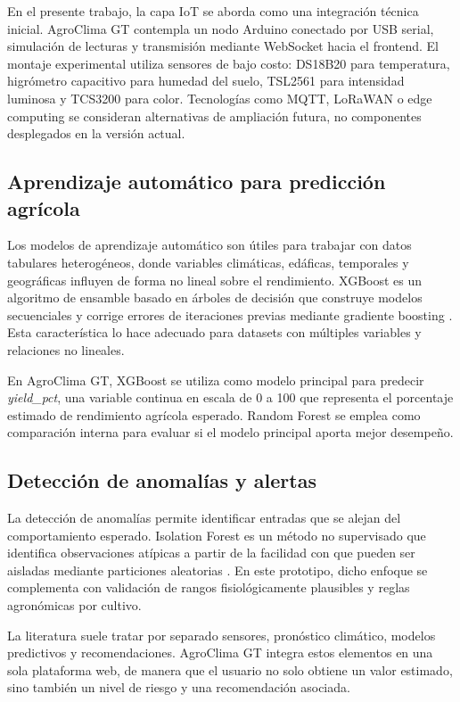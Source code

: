 \documentclass[conference,a4paper]{IEEEtran}
\begin{document}
En el presente trabajo, la capa IoT se aborda como una integración técnica inicial. AgroClima GT contempla un nodo Arduino conectado por USB serial, simulación de lecturas y transmisión mediante WebSocket hacia el frontend. El montaje experimental utiliza sensores de bajo costo: DS18B20 para temperatura, higrómetro capacitivo para humedad del suelo, TSL2561 para intensidad luminosa y TCS3200 para color. Tecnologías como MQTT, LoRaWAN o edge computing se consideran alternativas de ampliación futura, no componentes desplegados en la versión actual.

\subsection{Aprendizaje automático para predicción agrícola}
Los modelos de aprendizaje automático son útiles para trabajar con datos tabulares heterogéneos, donde variables climáticas, edáficas, temporales y geográficas influyen de forma no lineal sobre el rendimiento. XGBoost es un algoritmo de ensamble basado en árboles de decisión que construye modelos secuenciales y corrige errores de iteraciones previas mediante gradiente boosting \cite{chen2016xgboost}. Esta característica lo hace adecuado para datasets con múltiples variables y relaciones no lineales.

En AgroClima GT, XGBoost se utiliza como modelo principal para predecir \textit{yield\_pct}, una variable continua en escala de 0 a 100 que representa el porcentaje estimado de rendimiento agrícola esperado. Random Forest se emplea como comparación interna para evaluar si el modelo principal aporta mejor desempeño.

\subsection{Detección de anomalías y alertas}
La detección de anomalías permite identificar entradas que se alejan del comportamiento esperado. Isolation Forest es un método no supervisado que identifica observaciones atípicas a partir de la facilidad con que pueden ser aisladas mediante particiones aleatorias \cite{liu2008isolation}. En este prototipo, dicho enfoque se complementa con validación de rangos fisiológicamente plausibles y reglas agronómicas por cultivo.

La literatura suele tratar por separado sensores, pronóstico climático, modelos predictivos y recomendaciones. AgroClima GT integra estos elementos en una sola plataforma web, de manera que el usuario no solo obtiene un valor estimado, sino también un nivel de riesgo y una recomendación asociada.
\end{document}
